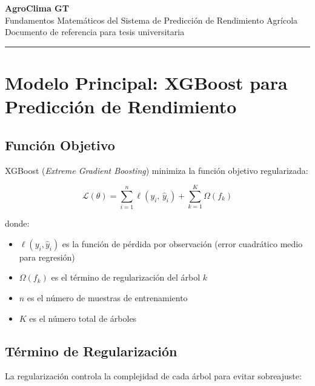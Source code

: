 \documentclass[12pt, a4paper]{article}
\begin{document}
\begin{center}
  {\LARGE \textbf{AgroClima GT}}\\[0.4em]
  {\large Fundamentos Matemáticos del Sistema de Predicción de Rendimiento Agrícola}\\[0.4em]
  {\small Documento de referencia para tesis universitaria}\\[1em]
  \rule{\linewidth}{0.4pt}
\end{center}

\tableofcontents
\newpage

\section{Modelo Principal: XGBoost para Predicción de Rendimiento}

\subsection{Función Objetivo}

XGBoost (\textit{Extreme Gradient Boosting}) minimiza la función objetivo regularizada:

\begin{equation}
  \mathcal{L}(\theta) = \sum_{i=1}^{n} \ell\!\left(y_i,\, \hat{y}_i\right) + \sum_{k=1}^{K} \Omega(f_k)
  \label{eq:xgb_objetivo}
\end{equation}

donde:
\begin{itemize}[leftmargin=2cm]
  \item $\ell(y_i, \hat{y}_i)$ es la función de pérdida por observación (error cuadrático medio para regresión)
  \item $\Omega(f_k)$ es el término de regularización del árbol $k$
  \item $n$ es el número de muestras de entrenamiento
  \item $K$ es el número total de árboles
\end{itemize}

\subsection{Término de Regularización}

La regularización controla la complejidad de cada árbol para evitar sobreajuste:
\end{document}
